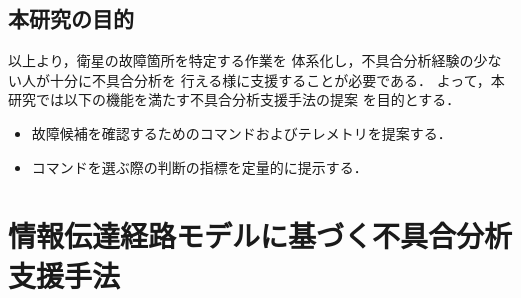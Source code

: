 \documentclass[11pt]{jsarticle}%
\begin{document}
\begin{multicols}{2}
\subsection{本研究の目的}
\vspace{-1zh}
以上より，衛星の故障箇所を特定する作業を
体系化し，不具合分析経験の少ない人が十分に不具合分析を
行える様に支援することが必要である．
よって，本研究では以下の機能を満たす不具合分析支援手法の提案%
を目的とする．%
  \begin{itemize}
  \item 故障候補を確認するためのコマンドおよびテレメトリを提案する．
  \item コマンドを選ぶ際の判断の指標を定量的に提示する．
\end{itemize}

\vspace{-1zh}
\section{情報伝達経路モデルに基づく不具合分析支援手法}
\vspace{-1zh}

\end{multicols}
\end{document}
